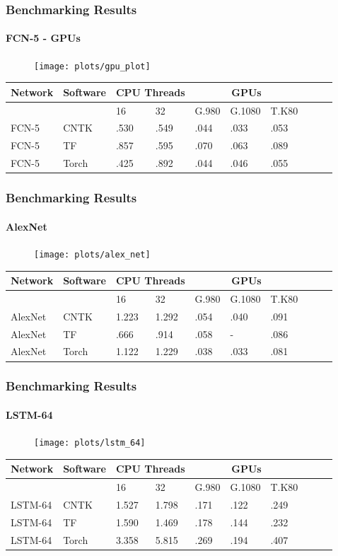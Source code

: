 \documentclass[9pt]{beamer}
\begin{document}
\begin{frame}
\frametitle{Benchmarking Results}
\framesubtitle{FCN-5 - GPUs}
\begin{table}
\begin{figure}
\centering
\texttt{[image: plots/gpu\_plot]}
\end{figure}
\tiny
\begin{tabular}{ |l|l|l|l|l|l|l|l|l|l| }
  \hline
Network & Software & \multicolumn{2}{|c|}{CPU Threads} & \multicolumn{3}{|c|}{GPUs}  \\ \hline
 & & 16 & 32 & G.980 & G.1080 & T.K80 \\ \hline \hline
FCN-5 & CNTK  & .530 & .549 & .044 &.033 & .053\\
FCN-5 & TF  & .857 & .595 & .070 & .063 & .089\\
FCN-5 & Torch & .425 & .892 & .044 & .046 & .055 \\ \hline
\end{tabular}
\end{table}
\end{frame}

\begin{frame}
\frametitle{Benchmarking Results}
\framesubtitle{AlexNet}
\begin{figure}
\centering
\texttt{[image: plots/alex\_net]}
\end{figure}
\begin{table}
\tiny
\begin{tabular}{ |l|l|l|l|l|l|l|l|l|l| }
  \hline
Network & Software & \multicolumn{2}{|c|}{CPU Threads} & \multicolumn{3}{|c|}{GPUs}  \\ \hline
 & & 16 & 32 & G.980 & G.1080 & T.K80 \\ \hline \hline
AlexNet & CNTK  & 1.223 & 1.292 &.054 & .040 & .091 \\
AlexNet & TF  & .666 & .914 & .058 & -  & .086\\
AlexNet & Torch  & 1.122 & 1.229 & .038 & .033 & .081 \\ \hline
\end{tabular}
\end{table}
\end{frame}

\begin{frame}
\frametitle{Benchmarking Results}
\framesubtitle{LSTM-64}
\begin{figure}
\centering
\texttt{[image: plots/lstm\_64]}
\end{figure}
\begin{table}
\tiny
\begin{tabular}{ |l|l|l|l|l|l|l|l|l|l| }
  \hline
Network & Software & \multicolumn{2}{|c|}{CPU Threads} & \multicolumn{3}{|c|}{GPUs}  \\ \hline
 & & 16 & 32 & G.980 & G.1080 & T.K80 \\ \hline \hline
LSTM-64 & CNTK  & 1.527 & 1.798 & .171 & .122 & .249 \\
LSTM-64 & TF  & 1.590 & 1.469 & .178 & .144 & .232 \\
LSTM-64 & Torch & 3.358 & 5.815 & .269 & .194 & .407 \\ \hline 
\end{tabular}
\end{table}
\end{frame}
\end{document}

